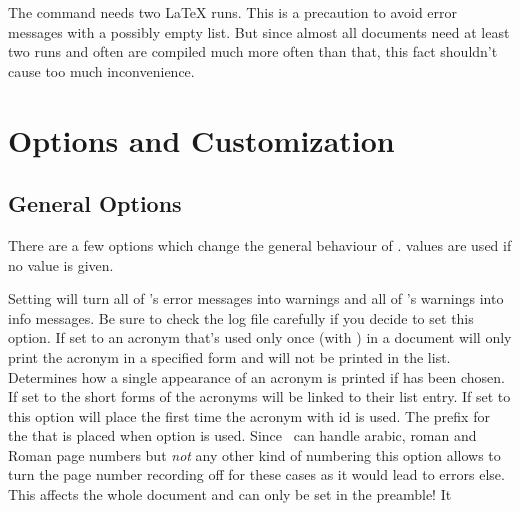 \documentclass[load-preamble+,scrartcl={DIV10}]{cnltx-doc}
\begin{document}
The command  needs two \LaTeX{} runs.  This is a precaution
to avoid error messages with a possibly empty list.  But since almost all
documents need at least two runs and often are compiled much more often than
that, this fact shouldn't cause too much inconvenience.

\section{Options and Customization}\label{sec:customization}
\subsection{General Options}
There are a few options which change the general behaviour of \acro.
 values are used if no value is given.
\begin{options}
    Setting  will turn all of
    \acro's error messages into warnings and all of \acro's warnings into info
    messages.  Be sure to check the log file carefully if you decide to set
    this option.
    If set to  an acronym that's used only once (with ) in a
    document will only print the acronym in a specified form and will not be
    printed in the list.
    Determines how a single appearance of an acronym is printed if
     has been chosen.
    If set to  the short forms of the acronyms will be linked to
    their list entry.
    If set to  this option will place
     the first time the acronym with
    \ac{id}  is used.
    The prefix for the  that is placed when
    option  is used.
    Since \acro\ can handle arabic, roman and Roman page numbers but
    \emph{not} any other kind of numbering this option allows to turn the page
    number recording off for these cases as it would lead to errors else.
    This affects the whole document and can only be set in the preamble!  It

\end{options}
\end{document}
